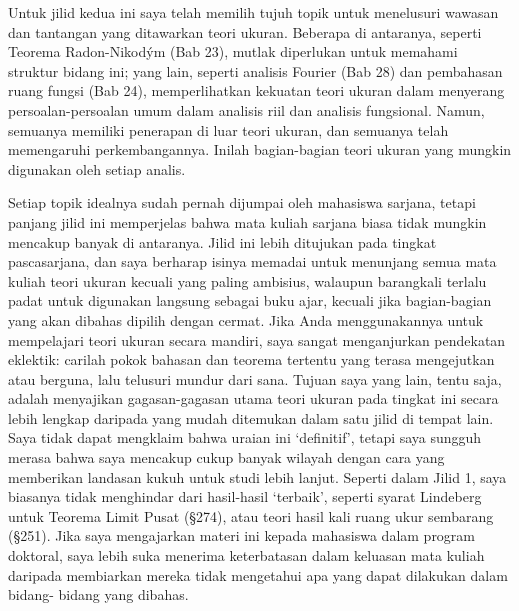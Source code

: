  
 
\medskip 
 
Untuk jilid kedua ini saya telah memilih tujuh topik untuk menelusuri
wawasan dan tantangan yang ditawarkan teori ukuran. Beberapa di antaranya,
seperti Teorema Radon-Nikod\'ym (Bab 23), mutlak diperlukan untuk memahami
struktur bidang ini; yang lain, seperti analisis Fourier (Bab 28) dan
pembahasan ruang fungsi (Bab 24), memperlihatkan kekuatan teori ukuran
dalam menyerang persoalan-persoalan umum dalam analisis riil dan analisis
fungsional. Namun, semuanya memiliki penerapan di luar teori ukuran, dan
semuanya telah memengaruhi perkembangannya. Inilah bagian-bagian teori
ukuran yang mungkin digunakan oleh setiap analis.
 
Setiap topik idealnya sudah pernah dijumpai oleh mahasiswa sarjana, tetapi
panjang jilid ini memperjelas bahwa mata kuliah sarjana biasa tidak mungkin
mencakup banyak di antaranya. Jilid ini lebih ditujukan pada tingkat
pascasarjana, dan saya berharap isinya memadai untuk menunjang semua mata
kuliah teori ukuran kecuali yang paling ambisius, walaupun barangkali
terlalu padat untuk digunakan langsung sebagai buku ajar, kecuali jika
bagian-bagian yang akan dibahas dipilih dengan cermat. Jika Anda
menggunakannya untuk mempelajari teori ukuran secara mandiri, saya sangat
menganjurkan pendekatan eklektik: carilah pokok bahasan dan teorema tertentu
yang terasa mengejutkan atau berguna, lalu telusuri mundur dari sana. Tujuan
saya yang lain, tentu saja, adalah menyajikan gagasan-gagasan utama teori
ukuran pada tingkat ini secara lebih lengkap daripada yang mudah
ditemukan dalam satu jilid di tempat lain. Saya tidak dapat mengklaim bahwa
uraian ini `definitif', tetapi saya sungguh merasa bahwa saya mencakup
cukup banyak wilayah dengan cara yang memberikan landasan kukuh untuk
studi lebih lanjut. Seperti dalam Jilid 1, saya biasanya tidak menghindar
dari hasil-hasil `terbaik', seperti syarat Lindeberg untuk Teorema Limit
Pusat (\S274), atau teori hasil kali ruang ukur sembarang (\S251).
Jika saya mengajarkan materi ini kepada mahasiswa dalam program doktoral,
saya lebih suka menerima keterbatasan dalam keluasan mata kuliah daripada
membiarkan mereka tidak mengetahui apa yang dapat dilakukan dalam bidang-
bidang yang dibahas.
 
